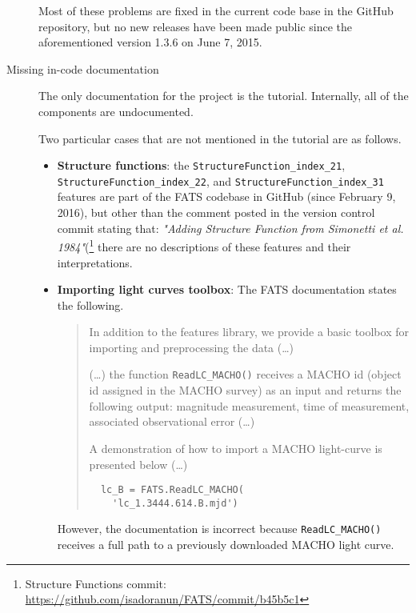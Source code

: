\documentclass[final,5p,times,twocolumn,authoryear]{elsarticle}
\begin{document}
\begin{description}
Most of these problems are fixed in the current code base in the GitHub repository, 
but no new releases have been made public since the aforementioned version 1.3.6 on June 7, 2015.

\item [Missing in-code documentation]
%
The only documentation for the project is the tutorial. Internally,
all of the components are undocumented. 

Two particular cases that are not mentioned in the tutorial are as follows.

\begin{itemize}
\item \textbf{Structure functions}: the \texttt{StructureFunction\_index\_21}, 
\texttt{StructureFunction\_index\_22}, and \texttt{StructureFunction\_index\_31} features
are part of the FATS codebase in GitHub (since February 9, 2016), 
but other than the comment posted in the version control commit stating that:
\textit{"Adding Structure Function from Simonetti et al. 1984"}(\footnote{Structure Functions commit: \url{https://github.com/isadoranun/FATS/commit/b45b5c1}} 
there are no descriptions of these features and their interpretations.

\item \textbf{Importing light curves toolbox}: The FATS documentation states the following. 

\begin{quotation}
  In addition to the features library, we provide a basic toolbox for importing and 
  preprocessing the data (\dots)

  (\dots) the function \texttt{ReadLC\_MACHO()} receives a MACHO id 
  (object id assigned in the MACHO survey) as an input and returns the 
  following output: magnitude measurement, time of 
  measurement, associated observational error (\dots)

  A demonstration of how to import a MACHO light-curve is presented below (\dots)
  \begin{verbatim}
  lc_B = FATS.ReadLC_MACHO(
  	'lc_1.3444.614.B.mjd')  
  \end{verbatim}
\end{quotation}
% 
However, the documentation is incorrect because \texttt{ReadLC\_MACHO()} receives a full path to a previously downloaded MACHO light curve.
\end{itemize}
%
\end{description}


\end{document}
